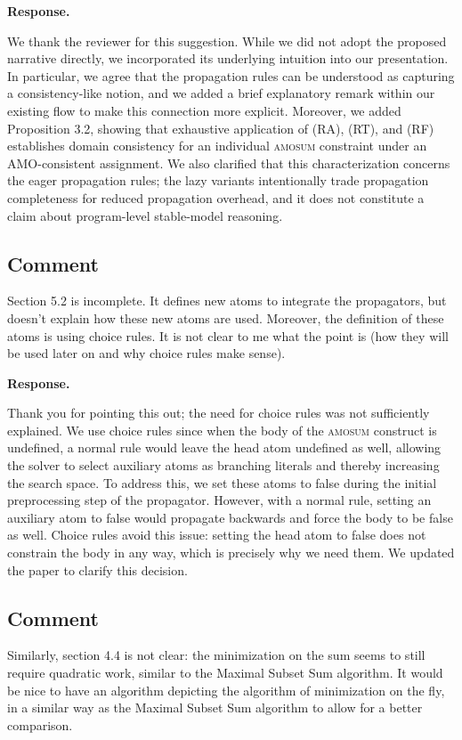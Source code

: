 \documentclass[11pt]{article}
\theoremstyle{definition}
\newcommand{\revieweranswered}{\subsection{Comment}}
\newenvironment{response}{
    \color{blue} \textbf{Response.}
}{
}
\begin{document}
\begin{response}
We thank the reviewer for this suggestion. While we did not adopt the proposed narrative directly, we incorporated its underlying intuition into our presentation. In particular, we agree that the propagation rules can be understood as capturing a consistency-like notion, and we added a brief explanatory remark within our existing flow to make this connection more explicit.
Moreover, we added Proposition 3.2, showing that exhaustive application of (RA), (RT), and (RF) establishes domain consistency for an individual \textsc{amosum} constraint under an AMO-consistent assignment. We also clarified that this characterization concerns the eager propagation rules; the lazy variants intentionally trade propagation completeness for reduced propagation overhead, and it does not constitute a claim about program-level stable-model reasoning.
\end{response}


\vspace{0.5cm}
\revieweranswered
Section 5.2 is incomplete. It defines new atoms to integrate the propagators, but doesn't explain how these new atoms are used. Moreover, the definition of these atoms is using choice rules. It is not clear to me what the point is (how they will be used later on and why choice rules make sense).

\begin{response}
Thank you for pointing this out; the need for choice rules was not sufficiently explained. We use choice rules since when the body of the \textsc{amosum} construct is undefined, a normal rule would leave the head atom undefined as well, allowing the solver to select auxiliary atoms as branching literals and thereby increasing the search space. To address this, we set these atoms to false during the initial preprocessing step of the propagator. However, with a normal rule, setting an auxiliary atom to false would propagate backwards and force the body to be false as well. Choice rules avoid this issue: setting the head atom to false does not constrain the body in any way, which is precisely why we need them.
We updated the paper to clarify this decision.
\end{response}

\vspace{0.5cm}
\revieweranswered 
Similarly, section 4.4 is not clear: the minimization on the sum seems to still require quadratic work, similar to the Maximal Subset Sum algorithm. It would be nice to have an algorithm depicting the algorithm of minimization on the fly, in a similar way as the Maximal Subset Sum algorithm to allow for a better comparison.
\end{document}
